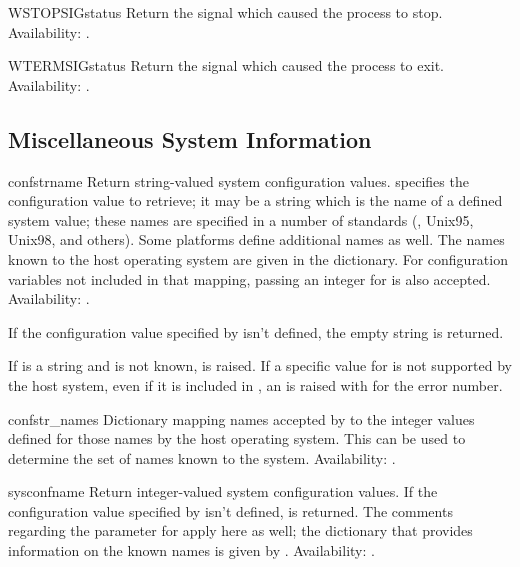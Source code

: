 \begin{funcdesc}{WSTOPSIG}{status}
Return the signal which caused the process to stop.
Availability: \UNIX{}.
\end{funcdesc}

\begin{funcdesc}{WTERMSIG}{status}
Return the signal which caused the process to exit.
Availability: \UNIX{}.
\end{funcdesc}


\subsection{Miscellaneous System Information \label{os-path}}


\begin{funcdesc}{confstr}{name}
Return string-valued system configuration values.
 specifies the configuration value to retrieve; it may be a
string which is the name of a defined system value; these names are
specified in a number of standards (\POSIX, Unix95, Unix98, and
others).  Some platforms define additional names as well.  The names
known to the host operating system are given in the
 dictionary.  For configuration variables not
included in that mapping, passing an integer for  is also
accepted.
Availability: \UNIX{}.

If the configuration value specified by  isn't defined, the
empty string is returned.

If  is a string and is not known,  is
raised.  If a specific value for  is not supported by the
host system, even if it is included in , an
 is raised with  for the
error number.
\end{funcdesc}

\begin{datadesc}{confstr_names}
Dictionary mapping names accepted by  to the
integer values defined for those names by the host operating system.
This can be used to determine the set of names known to the system.
Availability: \UNIX.
\end{datadesc}

\begin{funcdesc}{sysconf}{name}
Return integer-valued system configuration values.
If the configuration value specified by  isn't defined,
 is returned.  The comments regarding the 
parameter for  apply here as well; the dictionary
that provides information on the known names is given by
.
Availability: \UNIX{}.
\end{funcdesc}

